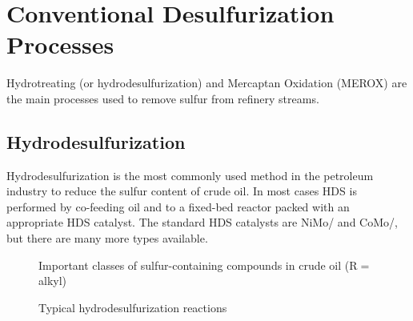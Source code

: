 \chapter{Conventional Desulfurization Processes}
\thispagestyle{plain}

Hydrotreating (or hydrodesulfurization) and Mercaptan Oxidation (MEROX) are the main processes used to remove sulfur from refinery streams.
\section{Hydrodesulfurization}

Hydrodesulfurization is the most commonly used method in the petroleum industry to reduce the sulfur content of crude oil. In most cases HDS is performed by co-feeding oil and  to a fixed-bed reactor packed with an appropriate HDS catalyst. The standard HDS catalysts are NiMo/ and CoMo/, but there are many more types available.

\begin{figure}[ht]
\centering
{}
\quad
{}
\quad
{}
\quad
{}
\quad
{}
\par
{}
\quad
{}
\quad
{}
\caption{Important classes of sulfur-containing compounds in crude oil (R$=$alkyl)}
\label{fig:compounds}
\end{figure}

\begin{figure}
\centering
{}
\caption{Typical hydrodesulfurization reactions \citep{moulijn2001chemical}}
\label{fig:hdsreactions}
\end{figure}


